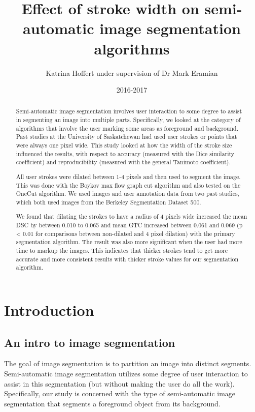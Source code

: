 \documentclass[12pt,a4paper,notitlepage]{article}
\title{Effect of stroke width on semi-automatic image segmentation algorithms}
\author{Katrina Hoffert under supervision of Dr Mark Eramian}
\date{2016-2017}
\begin{document}
\maketitle
\thispagestyle{empty}

\begin{abstract}
Semi-automatic image segmentation involves user interaction to some degree to assist in segmenting an image into multiple parts. Specifically, we looked at the category of algorithms that involve the user marking some areas as foreground and background. Past studies at the University of Saskatchewan had used user strokes or points that were always one pixel wide. This study looked at how the width of the stroke size influenced the results, with respect to accuracy (measured with the Dice similarity coefficient) and reproducibility (measured with the general Tanimoto coefficient).

All user strokes were dilated between 1-4 pixels and then used to segment the image. This was done with the Boykov max flow graph cut algorithm and also tested on the OneCut algorithm. We used images and user annotation data from two past studies, which both used images from the Berkeley Segmentation Dataset 500.

We found that dilating the strokes to have a radius of 4 pixels wide increased the mean DSC by between 0.010 to 0.065 and mean GTC increased between 0.061 and 0.069 (p < 0.01 for comparisons between non-dilated and 4 pixel dilation) with the primary segmentation algorithm. The result was also more significant when the user had more time to markup the images. This indicates that thicker strokes tend to get more accurate and more consistent results with thicker stroke values for our segmentation algorithm.

\end{abstract}

\section{Introduction}

\subsection{An intro to image segmentation}
The goal of image segmentation is to partition an image into distinct segments. Semi-automatic image segmentation utilizes some degree of user interaction to assist in this segmentation (but without making the user do all the work). Specifically, our study is concerned with the type of semi-automatic image segmentation that segments a foreground object from its background.
\end{document}
